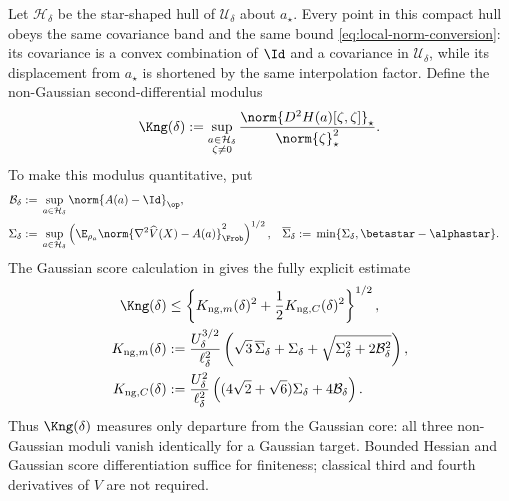 Let \(\mathcal H_\delta\) be the star-shaped hull of
\(\mathcal U_\delta\) about \(a_\star\).  Every point in this compact hull
obeys the same covariance band and the same bound
\eqref{eq:local-norm-conversion}: its covariance is a convex combination of
\(\Id\) and a covariance in \(\mathcal U_\delta\), while its displacement
from \(a_\star\) is shortened by the same interpolation factor.  Define the
non-Gaussian second-differential modulus
\begin{equation}
  \Kng(\delta)
  :=
  \sup_{\substack{a\in\mathcal H_\delta\\\zeta\neq0}}
  \frac{\norm{D^2H(a)[\zeta,\zeta]}_\star}
       {\norm{\zeta}_\star^2}.
  \label{eq:local-nongaussian-modulus}
\end{equation}
To make this modulus quantitative, put
\begin{align}
  \mathcal B_\delta
  &:={}
  \sup_{a\in\mathcal H_\delta}
  \norm{A(a)-\Id}_{\op},
  \label{eq:local-Bdelta}\\
  \Sigma_\delta
  &:={}
  \sup_{a\in\mathcal H_\delta}
  \left(
    \E_{\rho_a}
    \norm{\nabla^2\widehat V(X)-A(a)}_{\Frob}^2
  \right)^{1/2},
  &
  \overline\Sigma_\delta
  &:={}
  \min\{\Sigma_\delta,\betastar-\alphastar\}.
  \label{eq:local-Sigmadelta}
\end{align}
The Gaussian score calculation in  gives the fully
explicit estimate
\begin{align}
  \Kng(\delta)
  &\leq
  \left\{
    K_{\mathrm{ng},m}(\delta)^2
    +\frac12K_{\mathrm{ng},C}(\delta)^2
  \right\}^{1/2},
  \label{eq:local-Kng-explicit}\\
  K_{\mathrm{ng},m}(\delta)
  &:={}
  \frac{U_\delta^{3/2}}{\ell_\delta^2}
  \left(
    \sqrt3\,\overline\Sigma_\delta+\Sigma_\delta
    +\sqrt{\Sigma_\delta^2+2\mathcal B_\delta^2}
  \right),
  \label{eq:local-Kng-mean}\\
  K_{\mathrm{ng},C}(\delta)
  &:={}
  \frac{U_\delta^2}{\ell_\delta^2}
  \left((4\sqrt2+\sqrt6)\Sigma_\delta+4\mathcal B_\delta\right).
  \label{eq:local-Kng-covariance}
\end{align}
Thus \(\Kng(\delta)\) measures only departure from the Gaussian core: all
three non-Gaussian moduli vanish identically for a Gaussian target.  Bounded
Hessian and Gaussian score differentiation suffice for finiteness; classical
third and fourth derivatives of \(V\) are not required.

